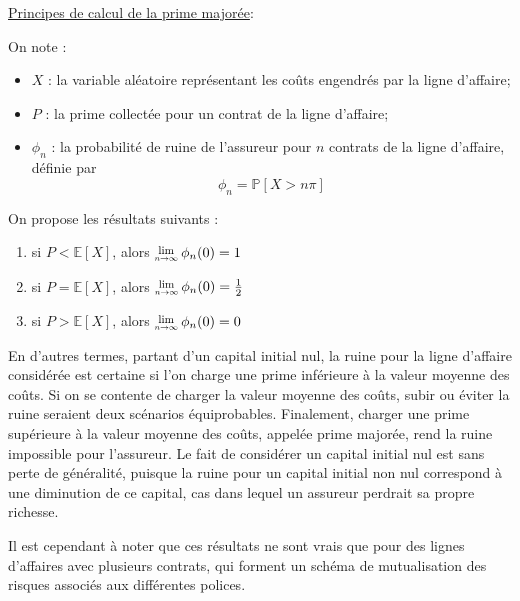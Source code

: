\documentclass[11pt]{article}
\newcommand{\Lim}[1]{\raisebox{0.5ex}{\scalebox{0.8}{$\displaystyle \lim_{#1}\;$}}}
\begin{document}
\underline{Principes de calcul de la prime majorée}:

\noindent On note :
\begin{itemize}
\item $X$ : la variable aléatoire représentant les coûts engendrés par la ligne d'affaire;
\item $P$ : la prime collectée pour un contrat de la ligne d'affaire;
\item $\phi_n$ : la probabilité de ruine de l'assureur pour $n$ contrats de la ligne d'affaire, définie par
\begin{equation}
\phi_n = \mathbb{P} \left[ X > n\pi \right]
\end{equation}
\end{itemize}

On propose les résultats suivants :
\begin{enumerate}
\item si $P < \mathbb{E}[X]$, alors $\Lim{n \rightarrow \infty}\phi_n(0) = 1$
\item si $P = \mathbb{E}[X]$, alors $\Lim{n \rightarrow \infty}\phi_n(0) = \frac{1}{2}$
\item si $P > \mathbb{E}[X]$, alors $\Lim{n \rightarrow \infty}\phi_n(0) = 0$
\end{enumerate}

En d'autres termes, partant d'un capital initial nul, la ruine pour la ligne d'affaire considérée est certaine si l'on charge une prime inférieure à la valeur moyenne des coûts. Si on se contente de charger la valeur moyenne des coûts, subir ou éviter la ruine seraient deux scénarios équiprobables. Finalement, charger une prime supérieure à la valeur moyenne des coûts, appelée prime majorée, rend la ruine impossible pour l'assureur. Le fait de considérer un capital initial nul est sans perte de généralité, puisque la ruine pour un capital initial non nul correspond à une diminution de ce capital, cas dans lequel un assureur perdrait sa propre richesse.

Il est cependant à noter que ces résultats ne sont vrais que pour des lignes d'affaires avec plusieurs contrats, qui forment un schéma de mutualisation des risques associés aux différentes polices.
\end{document}
